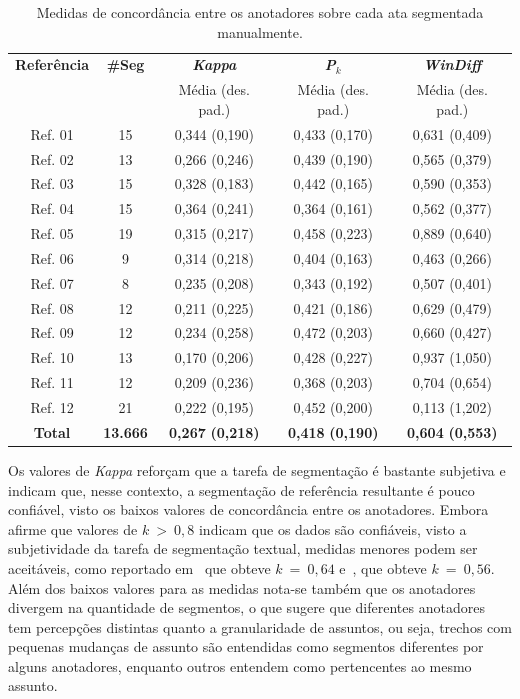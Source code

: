 \begin{table}[!h]
	\centering
 \begin{tabular}{|c|c|c|c|c|}

\hline
\textbf{Referência}  & \textbf{\#Seg} & \textbf{\textit{Kappa}}  & \textbf{\textit{P}$_k$}                &  \textbf{\textit{WinDiff}}\\ 
	& & Média (des. pad.) & Média (des. pad.)&Média (des. pad.) \\ \hline
Ref. 01     & 15    & 0,344  (0,190) & 0,433  (0,170) & 0,631  (0,409) \\ \hline
Ref. 02     & 13    & 0,266  (0,246) & 0,439  (0,190) & 0,565  (0,379) \\ \hline
Ref. 03     & 15    & 0,328  (0,183) & 0,442  (0,165) & 0,590  (0,353) \\ \hline
Ref. 04     & 15    & 0,364  (0,241) & 0,364  (0,161) & 0,562  (0,377) \\ \hline
Ref. 05     & 19    & 0,315  (0,217) & 0,458  (0,223) & 0,889  (0,640) \\ \hline
Ref. 06     & 9     & 0,314  (0,218) & 0,404  (0,163) & 0,463  (0,266) \\ \hline
Ref. 07     & 8     & 0,235  (0,208) & 0,343  (0,192) & 0,507  (0,401) \\ \hline
Ref. 08     & 12    & 0,211  (0,225) & 0,421  (0,186) & 0,629  (0,479) \\ \hline
Ref. 09     & 12    & 0,234  (0,258) & 0,472  (0,203) & 0,660  (0,427) \\ \hline
Ref. 10     & 13    & 0,170  (0,206) & 0,428  (0,227) & 0,937  (1,050) \\ \hline
Ref. 11     & 12    & 0,209  (0,236) & 0,368  (0,203) & 0,704  (0,654) \\ \hline
Ref. 12     & 21    & 0,222  (0,195) & 0,452  (0,200) & 0,113  (1,202) \\ \hline
\textbf{Total}      & \textbf{13.666} & \textbf{0,267}  \textbf{(0,218)} & \textbf{0,418}  \textbf{(0,190)} & \textbf{0,604}  \textbf{(0,553)} \\ \hline
\end{tabular}
\caption{Medidas de concordância entre os anotadores sobre cada ata segmentada manualmente.}
\label{tab:detalhesSegRef}
\end{table}




Os valores de \textit{Kappa} reforçam que a tarefa de segmentação é bastante subjetiva e indicam que, nesse contexto, a segmentação de referência resultante é pouco confiável, visto os baixos valores de concordância entre os anotadores. 
Embora~\cite{Carletta1996} afirme que valores de $k~>~0,8$ indicam que os dados são confiáveis, visto a subjetividade da tarefa de segmentação textual, medidas menores podem ser aceitáveis, como reportado em~\cite{Hearst1997} que obteve $k~=~0,64$ e~\cite{Cardoso2017}, que obteve $k~=~0,56$. Além dos baixos valores para as medidas nota-se também que os anotadores divergem na quantidade de segmentos, o que sugere que diferentes anotadores tem percepções distintas quanto a granularidade de assuntos, ou seja, trechos com pequenas mudanças de assunto são entendidas como segmentos diferentes por alguns anotadores, enquanto outros entendem como pertencentes ao mesmo assunto.

